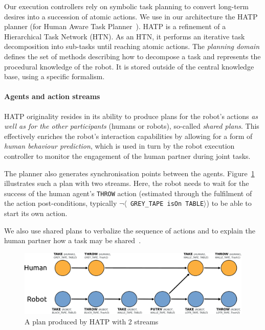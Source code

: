 \documentclass[preprint,3p,times]{elsarticle}
\newcommand{\stmt}[1]{{\footnotesize \tt $\langle$ #1\relax$\rangle$}}
\begin{document}
Our execution controllers rely on symbolic task planning to convert long-term
desires into a succession of atomic actions. We use in our architecture the
HATP planner (for Human Aware Task Planner~\cite{Alili2008, Alili2009}).  HATP
is a refinement of a Hierarchical Task Network (HTN). As an HTN, it performs an
iterative task decomposition into sub-tasks until reaching atomic actions. The
\emph{planning domain} defines the set of methods describing how to decompose a
task and represents the procedural knowledge of the robot. It is stored outside
of the central knowledge base, using a specific formalism.

\paragraph{Agents and action streams}

HATP originality resides in its ability to produce plans for the robot's actions
\emph{as well as for the other participants} (humans or robots), so-called
\emph{shared plans}. This effectively enriches the robot's interaction
capabilities by allowing for a form of \emph{human behaviour prediction}, which
is used in turn by the robot execution controller to monitor the engagement of
the human partner during joint tasks.

The planner also generates synchronisation points between the agents.
Figure~\ref{plan_hatp1} illustrates such a plan with two streams.  Here, the
robot needs to wait for the success of the human agent's {\tt THROW} action
(estimated through the fulfilment of the action post-conditions, typically
$\neg$\stmt{GREY\_TAPE isOn TABLE}) to be able to start its own action.

We also use shared plans to verbalize the sequence of actions and to explain
the human partner how a task may be shared~\cite{warnier2012when}.

\begin{figure}[htbp]
  \centering
  \includegraphics[width=0.95\columnwidth]{first_plan.pdf}
  \caption{A plan produced by HATP with 2 streams}
  \label{plan_hatp1}
\end{figure}
\end{document}
